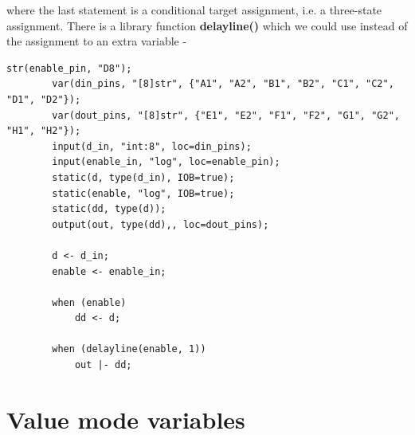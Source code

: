 \documentclass[10pt,a4paper,twoside,fleqn]{article}
\newcommand{\var}[1]{{\bf #1}} %
\begin{document}
    where the last statement is a conditional target assignment, i.e. a
    three-state assignment. There is a library function \var{delayline()} which
    we could use instead of the assignment to an extra variable -

    \begin{lstlisting}[language=threepl]
        str(enable_pin, "D8");
        var(din_pins, "[8]str", {"A1", "A2", "B1", "B2", "C1", "C2", "D1", "D2"});
        var(dout_pins, "[8]str", {"E1", "E2", "F1", "F2", "G1", "G2", "H1", "H2"});
        input(d_in, "int:8", loc=din_pins);
        input(enable_in, "log", loc=enable_pin);
        static(d, type(d_in), IOB=true);
        static(enable, "log", IOB=true);       
        static(dd, type(d));
        output(out, type(dd),, loc=dout_pins);

        d <- d_in;
        enable <- enable_in;

        when (enable)
            dd <- d;
        
        when (delayline(enable, 1))
            out |- dd;
    \end{lstlisting}



\section{Value mode variables}
   
\end{document}
